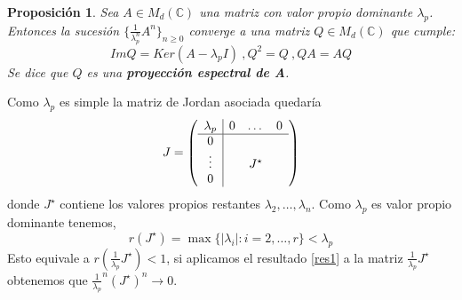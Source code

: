 \documentclass[size=a4, parskip=half, titlepage=false, toc=flat, toc=bib, 12pt]{scrartcl}
\makeatletter
\renewenvironment{proof}[1][\proofname] {\par\pushQED{\qed}\normalfont\topsep6\p@\@plus6\p@\relax\trivlist\item[\hskip\labelsep\itshape\tgpaella#1\@addpunct{.}]\ignorespaces}{\popQED\endtrivlist\@endpefalse}
\theoremstyle{theorem-style}
\newtheorem{nprop}{Proposición}[section]
\theoremstyle{definition-style}
\theoremstyle{remark-style}
\theoremstyle{example-style}
\theoremstyle{definition-style}
\theoremstyle{remark-style}
\makeatother
\begin{document}
\begin{nprop} Sea $A \in M_d(\mathbb{C})$ una matriz con valor propio dominante $\lambda_p$. Entonces la sucesión $\{\frac{1}{ \lambda_p^n } A^n \}_{n\geq 0}$ converge a una matriz $Q \in M_d(\mathbb{C})$ que cumple:
$$ImQ = Ker ( A - \lambda_p I) \ , Q^2 = Q \ , QA = AQ $$
Se dice que $Q$ es una \textbf{proyección espectral de A}.
\end{nprop}

\begin{proof}
Como $\lambda_p$ es simple la matriz de Jordan asociada quedaría $$
  J =
    \left(
      \begin{array}{{c|ccc}}
        \lambda_p     &    0      &   \dots    & 0\\\hline
            0         &           &        &  \\
            \vdots    &           & J^{\star} &  \\
           0          &           &        &
      \end{array}
    \right)
$$ donde $J^{\star}$ contiene los valores propios restantes $\lambda_2, \dots, \lambda_n$.
Como $\lambda_p$ es valor propio dominante tenemos,
$$r(J^{\star}) = \max \{ |\lambda_i| : i = 2, \dots , r \} < \lambda_p $$
Esto equivale a $r(\frac{1}{\lambda_p} J^{\star}) < 1$, si aplicamos el resultado \ref{res1} a la matriz $\frac{1}{\lambda_p} J^{\star}$ obtenemos que $\frac{1}{\lambda_p}^n (J^{\star})^n \rightarrow 0$.


\end{proof}
\end{document}
